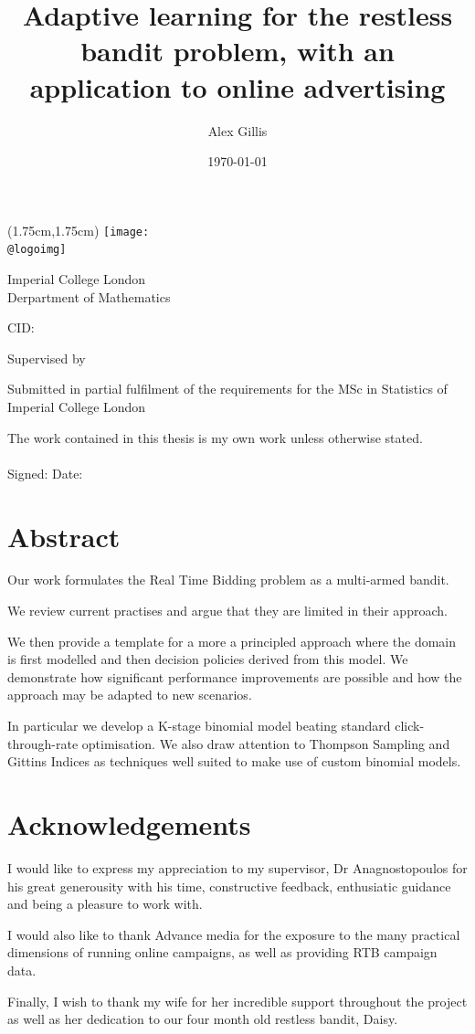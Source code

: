 \documentclass[11pt,a4,singlespacing,titlepagenumber=on]{scrreprt}
\title{Adaptive learning for the restless bandit problem, with an application to online advertising}
\author{Alex Gillis}
\date{\today}
\makeatletter
\numberwithin{equation}{chapter} %
\theoremstyle{remark}
\renewcommand{\maketitle}{
\begin{titlepage}
\ifdefined\@logoimg
\begin{textblock*}{8cm}(1.75cm,1.75cm)
\texttt{[image: \\@logoimg]}
\end{textblock*}
\vspace*{1cm}
\else
\fi
\begin{center}
\vspace*{\stretch{0.1}}
Imperial College London\\
Derpartment of Mathematics\par
\vspace*{\stretch{1}} %
{\titlefont\Huge \@title\par} %
\vspace*{\stretch{2}}
{\Large \@author \par}
\vspace*{1em}
{\large CID: \@CID \par}
\vspace*{\stretch{0.5}}
{\large Supervised by \@supervisor \par}
\vspace*{\stretch{3}}
{\Large \@date \par}
\vspace*{\stretch{1}}
{\large Submitted in partial fulfilment of the requirements for the
MSc in Statistics of Imperial College London}
\vspace*{\stretch{0.1}}
\end{center}%
\end{titlepage}%
}
\newcommand*{\declaration}{%
\vspace*{0.3\textheight}
The work contained in this thesis is my own work unless
otherwise stated.\\
\vspace*{0.1\textheight}\\
\hspace*{0.25\textwidth}Signed: \hspace{0.25\textwidth} Date:
\clearpage}
\renewenvironment{abstract}%
{\chapter*{Abstract}\thispagestyle{plain}}%
{\clearpage}
\makeatother
\begin{document}
\maketitle %

\declaration %

\begin{abstract}

Our work formulates the Real Time Bidding problem as a multi-armed bandit.

We review current practises and argue that they are limited in their approach. 

We then provide a template for a more a principled approach where the domain is first modelled and then decision policies derived from this model. We demonstrate how significant performance improvements are possible and how the approach may be adapted to new scenarios.
 
In particular we develop a K-stage binomial model beating standard click-through-rate optimisation. We also draw attention to Thompson Sampling and Gittins Indices as techniques well suited to make use of custom binomial models.

\end{abstract}

\newpage
\chapter*{Acknowledgements}

I would like to express my appreciation to my supervisor, Dr Anagnostopoulos for his great generousity with his time, constructive feedback, enthusiatic guidance and being a pleasure to work with.

I would also like to thank Advance media for the exposure to the many practical dimensions of running online campaigns, as well as providing RTB campaign data. 

Finally, I wish to thank my wife for her incredible support throughout the project as well as her dedication to our four month old restless bandit, Daisy.

\newpage

\renewcommand{\contentsname}{Table of Contents}
\tableofcontents
\newpage

\end{document}
